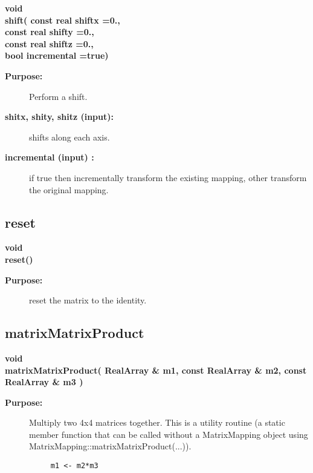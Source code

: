 \begin{flushleft} \textbf{%
void  \\ 
\settowidth{\MatrixMappingIncludeArgIndent}{shift(}%
shift( const real shiftx  =0., \\ 
\hspace{\MatrixMappingIncludeArgIndent}const real shifty  =0.,\\ 
\hspace{\MatrixMappingIncludeArgIndent}const real shiftz  =0., \\ 
\hspace{\MatrixMappingIncludeArgIndent}bool incremental   =true)
}\end{flushleft}
\begin{description}
\item[{\bf Purpose:}]  Perform a shift.
\item[{\bf shitx, shity, shitz (input):}]  shifts along each axis.
\item[{\bf incremental (input) :}]  if true then incrementally transform the 
       existing mapping, other transform the original mapping.
\end{description}
\subsection{reset}
 
\begin{flushleft} \textbf{%
void  \\ 
\settowidth{\MatrixMappingIncludeArgIndent}{reset(}%
reset()
}\end{flushleft}
\begin{description}
\item[{\bf Purpose:}]  reset the matrix to the identity.
\end{description}
\subsection{matrixMatrixProduct}
 
\begin{flushleft} \textbf{%
void  \\ 
\settowidth{\MatrixMappingIncludeArgIndent}{matrixMatrixProduct(}%
matrixMatrixProduct( RealArray \& m1, const RealArray \& m2, const RealArray \& m3 )
}\end{flushleft}
\begin{description}
\item[{\bf Purpose:}]  
   Multiply two 4x4 matrices together. This is a utility routine (a static member function that
 can be called without a MatrixMapping object using MatrixMapping::matrixMatrixProduct(...)).
 \begin{verbatim}
     m1 <- m2*m3
 \end{verbatim}
\end{description}
